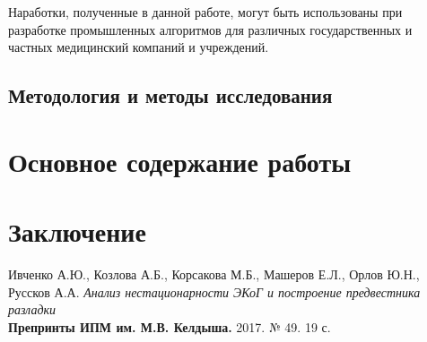 \documentclass[a4paper,12pt]{report}
\begin{document}
Наработки, полученные в данной работе, могут быть использованы при разработке промышленных алгоритмов для различных государственных и частных медицинский компаний и учреждений.

\section{Методология и методы исследования}


\chapter{Основное содержание работы}


\chapter{Заключение}


\begin{thebibliography}{9}

Ивченко А.Ю., Козлова А.Б., Корсакова М.Б., Машеров Е.Л., Орлов Ю.Н., Руссков А.А. \textit{Анализ нестационарности ЭКоГ и построение предвестника разладки} \\
\textbf{Препринты ИПМ им. М.В. Келдыша.} 2017. № 49. 19 с.

\end{thebibliography}
\end{document}
